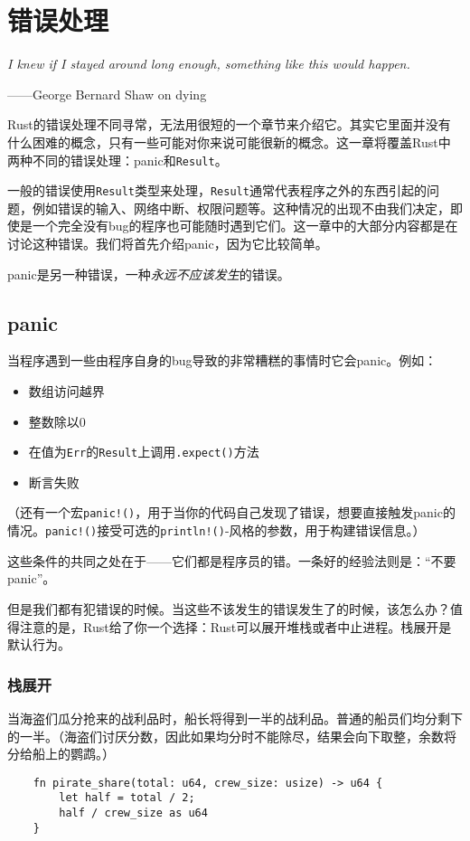 \chapter{错误处理}\label{ch07}

\emph{I knew if I stayed around long enough, something like this would happen.}

\begin{flushright}
    ——George Bernard Shaw on dying
\end{flushright}

Rust的错误处理不同寻常，无法用很短的一个章节来介绍它。其实它里面并没有什么困难的概念，只有一些可能对你来说可能很新的概念。这一章将覆盖Rust中两种不同的错误处理：panic和\texttt{Result}。

一般的错误使用\texttt{Result}类型来处理，\texttt{Result}通常代表程序之外的东西引起的问题，例如错误的输入、网络中断、权限问题等。这种情况的出现不由我们决定，即使是一个完全没有bug的程序也可能随时遇到它们。这一章中的大部分内容都是在讨论这种错误。我们将首先介绍panic，因为它比较简单。

panic是另一种错误，一种\emph{永远不应该发生}的错误。

\section{panic}

当程序遇到一些由程序自身的bug导致的非常糟糕的事情时它会panic。例如：
\begin{itemize}
    \item 数组访问越界
    \item 整数除以0
    \item 在值为\texttt{Err}的\texttt{Result}上调用\texttt{.expect()}方法
    \item 断言失败
\end{itemize}

（还有一个宏\texttt{panic!()}，用于当你的代码自己发现了错误，想要直接触发panic的情况。\texttt{panic!()}接受可选的\texttt{println!()}-风格的参数，用于构建错误信息。）

这些条件的共同之处在于——它们都是程序员的错。一条好的经验法则是：“不要panic”。

但是我们都有犯错误的时候。当这些不该发生的错误发生了的时候，该怎么办？值得注意的是，Rust给了你一个选择：Rust可以展开堆栈或者中止进程。栈展开是默认行为。

\subsection{栈展开}\label{unwind}
当海盗们瓜分抢来的战利品时，船长将得到一半的战利品。普通的船员们均分剩下的一半。（海盗们讨厌分数，因此如果均分时不能除尽，结果会向下取整，余数将分给船上的鹦鹉。）
\begin{verbatim}
    fn pirate_share(total: u64, crew_size: usize) -> u64 {
        let half = total / 2;
        half / crew_size as u64
    }
\end{verbatim}

